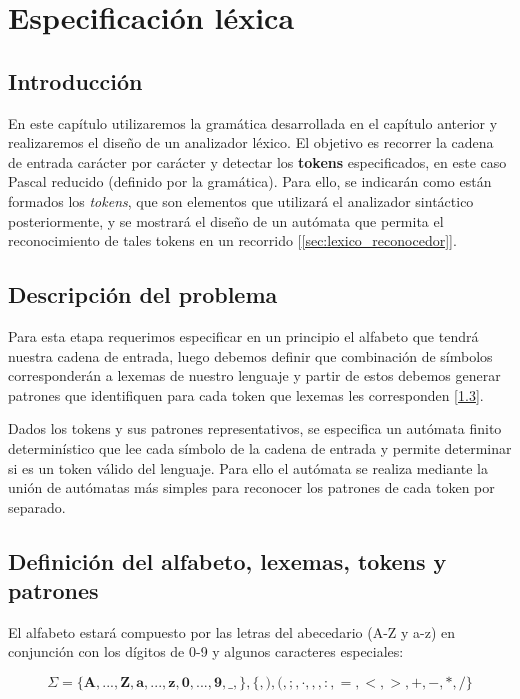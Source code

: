 \chapter{Especificación léxica}

\section{Introducción}
En este capítulo utilizaremos la gramática desarrollada en el capítulo anterior y realizaremos el diseño de un analizador léxico. El objetivo es recorrer la cadena de entrada carácter por carácter y detectar los {\bf tokens} especificados, en este caso Pascal reducido (definido por la gramática).
Para ello, se indicarán como están formados los \emph{tokens}, que son elementos que utilizará el analizador sintáctico posteriormente, y se mostrará el diseño de un autómata que permita el reconocimiento de tales tokens en un recorrido [\ref{sec:lexico_reconocedor}].

\section{Descripción del problema}
Para esta etapa requerimos especificar en un principio el alfabeto que tendrá nuestra cadena de entrada, luego debemos definir que combinación de símbolos corresponderán a lexemas de nuestro lenguaje y partir de estos debemos generar patrones que identifiquen para cada token que lexemas les corresponden [\ref{sec:lexico_definicion}].

Dados los tokens y sus patrones representativos, se especifica un autómata finito determinístico que lee cada símbolo de la cadena de entrada y permite determinar si es un token válido del lenguaje. Para ello el autómata se realiza mediante la unión de autómatas más simples para reconocer los patrones de cada token por separado.

\section{Definición del alfabeto, lexemas, tokens y patrones}
\label{sec:lexico_definicion}
El alfabeto estará compuesto por las letras del abecedario (A-Z y a-z) en conjunción con los dígitos de 0-9 y algunos caracteres especiales:

$$ \Sigma = \{ \bm{A}, ..., \bm{Z}, \bm{a}, ..., \bm{z}, \bm{0}, ..., \bm{9}, \bm{\_}, \bm{\}}, \bm{\{}, \bm{)}, \bm{(}, \bm{;}, \bm{\cdot}, \bm{,}, \bm{:}, \bm{=}, \bm{<}, \bm{>}, \bm{+}, \bm{-}, \bm{*}, \bm{/} \}$$

